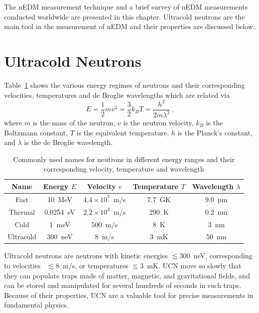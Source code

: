 The nEDM measurement technique and a brief survey of nEDM measurements
conducted worldwide are presented in this chapter. Ultracold neutrons
are the main tool in the measurement of nEDM and their properties are
discussed below.
\section{Ultracold Neutrons\label{sec:ucnproperties}}
Table~\ref{tab:ucnenergy} shows the various energy regimes of neutrons
and their corresponding velocities, temperatures and de Broglie
wavelengths which are related via
\begin{equation}
  \label{eqn:ucnenergy}
  E = \frac{1}{2} m v^2 = \frac{3}{2} k_B T = \frac{h^2}{2m \lambda^2}~,
\end{equation}
where $m$ is the mass of the neutron, $v$ is the neutron velocity,
$k_B$ is the Boltzmann constant, $T$ is the equivalent temperature,
$h$ is the Planck's constant, and $\lambda$ is the de Broglie
wavelength.

\begin{table}
  \centering
  \begin{tabular}{|c|c|c|c|c|}
    \hline
    Name & Energy $E$ & Velocity $v$ & Temperature $T$ & Wavelength $\lambda$ \\
    \hline
    \hline
    Fast & 10~MeV & $4.4 \times 10^7$~m/s & $7.7$~GK & 9.0~pm \\
    \hline
    Thermal & 0.0254~eV & $ 2.2 \times 10^3$~m/s & 290~K & 0.2~nm \\
    \hline
    Cold & 1~meV & 500~m/s & 8~K & 3~nm \\
    \hline
    Ultracold & 300~neV & 8~m/s & 3~mK & 50~nm \\
    \hline
  \end{tabular}
  \caption[Neutron names in different energy ranges and their
  corresponding velocities, temperatures, and wavelength]{Commonly
    used names for neutrons in different energy ranges and their
    corresponding velocity, temperature and
    wavelength \label{tab:ucnenergy}}
\end{table}


Ultracold neutrons are neutrons with kinetic energies $\lesssim 300$~neV,
corresponding to velocities ~$\lesssim 8$~m/s, or temperatures
$\lesssim 3$~mK. UCN move so slowly that they can populate traps made
of matter, magnetic, and gravitational fields, and can be stored and
manipulated for several hundreds of seconds in such traps. Because of
their properties, UCN are a valuable tool for precise measurements in
fundamental physics.

